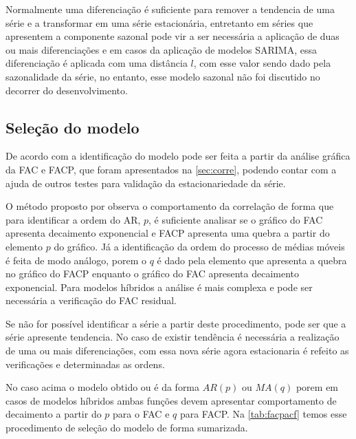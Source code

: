 \documentclass[
    12pt,
    oneside,
    a4paper,
    english,
    brazil
]{abntex2}
\begin{document}
Normalmente  uma diferenciação  é suficiente  para remover  a tendencia  de uma
série  e a  transformar em  uma série  estacionária, entretanto  em séries  que
apresentem a componente  sazonal pode vir a ser necessária  a aplicação de duas
ou  mais  diferenciações e  em  casos  da  aplicação  de modelos  SARIMA,  essa
diferenciação é aplicada com uma distância  $l$, com esse valor sendo dado pela
sazonalidade da  série, no entanto,  esse modelo  sazonal não foi  discutido no
decorrer do desenvolvimento.

\subsection{Seleção do modelo}

De  acordo  com   a  identificação  do  modelo pode  ser  feita
a  partir  da  análise  gráfica  da  FAC e  FACP,  que  foram  apresentados  na
\autoref{sec:corre}, podendo contar com a ajuda de outros testes para validação
da estacionariedade da série.

O método proposto por  observa o comportamento da correlação de
forma que  para identificar  a ordem  do AR,  $p$, é  suficiente analisar  se o
gráfico do FAC  apresenta decaimento exponencial e FACP apresenta  uma quebra a
partir do elemento $p$  do gráfico. Já a identificação da  ordem do processo de
médias móveis  é feita de modo  análogo, porem o  $q$ é dado pela  elemento que
apresenta  a quebra  no gráfico  do FACP  enquanto o  gráfico do  FAC apresenta
decaimento exponencial. Para modelos híbridos a  análise é mais complexa e pode
ser necessária a verificação do FAC residual.

Se não for  possível identificar a série a partir  deste procedimento, pode ser
que a  série apresente  tendencia. No  caso de  existir tendência  é necessária
a  realização  de  uma  ou  mais diferenciações,  com  essa  nova  série  agora
estacionaria é refeito as verificações e determinadas as ordens.

No caso acima o  modelo obtido ou é da forma $AR(p)$ ou  $MA(q)$ porem em casos
de modelos híbridos ambas funções  devem apresentar comportamento de decaimento
a partir do  $p$ para o FAC  e $q$ para FACP\@.  Na \autoref{tab:facpacf} temos
esse procedimento de seleção do modelo de forma sumarizada.
\end{document}
